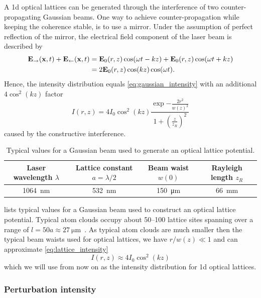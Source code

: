 A \gls{1d} optical lattices can be generated through the interference
of two counter-propagating Gaussian beams. One way to achieve
counter-propagation while keeping the coherence stable, is to use a mirror.
Under the assumption of perfect reflection of the mirror, the electrical field
component of the laser beam is described by
\begin{align*}
  \vb{E}_\rightarrow(\vb{x},t)+\vb{E}_\leftarrow(\vb{x},t)
  &=
  \vb{E}_0(r,z)\cos(\omega t-kz)+\vb{E}_0(r,z)\cos(\omega t+kz)\\
  &=
  2\vb{E}_0(r,z)\cos(kz)\cos(\omega t).
\end{align*}
Hence, the intensity distribution equals
\cref{eq:gaussian_intensity} with an additional $4\cos^2(kz)$ factor
\begin{equation}
  I(r,z)
  =
  4I_0\cos^2(kz)
  \frac{\exp{-\frac{2r^2}{w{(z)}^2}}}{1+{\left(\frac{z}{z_R}\right)}^2}
  \label{eq:lattice_intensity}
\end{equation}
caused by the constructive interference.
\begin{table}[htb]
  \centering
  \begin{tabular}{cccc}
    \toprule
    Laser wavelength $\lambda$ &
    Lattice constant $a=\lambda/2$ &
    Beam waist $w(0)$ &
    Rayleigh length $z_R$ \\
    \midrule
    \SI{1064}{\nano\meter} &
    \SI{532}{\nano\meter} &
    \SI{150}{\micro\meter} &
    \SI{66}{\milli\meter} \\
    \bottomrule
  \end{tabular}
  \captionsetup{width=.8\textwidth}
  \caption{Typical values for a Gaussian beam used to generate an optical
    lattice potential.
  }\label{tab:gaussian_beam_lattice}
\end{table}
 lists typical values for a Gaussian beam
used to construct an optical lattice potential. Typical atom clouds occupy
about 50--100 lattice sites spanning over a range of
$l=50a\approx\SI{27}{\micro\meter}$~\cite{Rom2009}. As typical atom clouds
are much smaller then the typical beam waists used for optical lattices, we
have $r/w(z)\ll1$ and can approximate \cref{eq:lattice_intensity}
\begin{equation}
  I(r,z)
  \approx
  4I_0\cos^2(kz)
  \label{eq:gaussian_intensity_approx}
\end{equation}
which we will use from now on as the intensity distribution for \gls{1d}
optical lattices.

\subsubsection{Perturbation intensity}

